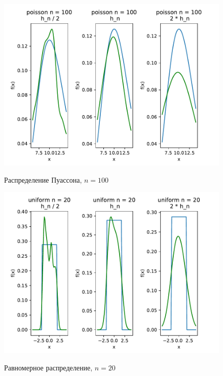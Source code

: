 \documentclass[a4paper]{article}
\begin{document}
\begin{figure}[H]
	\centering
	{\includegraphics[scale=0.5]{src_lab_4/kde_100_poisson}}
		\caption{Распределение Пуассона, $n=100$}
		\label{fig:kde_poisson_100}
	\end{figure}

\begin{figure}[H]
	\centering
	{\includegraphics[scale=0.5]{src_lab_4/kde_20_uniform}}
		\caption{Равномерное распределение, $n=20$}
		\label{fig:kde_uniform_20}
	\end{figure}
\end{document}
